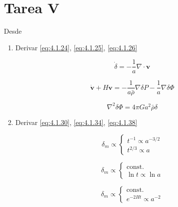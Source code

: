 \documentclass[a4paper]{article}
\begin{document}
\section{Tarea V}
Desde \cite{BaumannTripos}
\begin{enumerate}
	\item Derivar \eqref{eq:4.1.24}, \eqref{eq:4.1.25}, \eqref{eq:4.1.26}
	
\begin{equation}
\dot{\delta} = -\frac{1}{a} \nabla \cdot \mathbf{v}
\tag{4.1.24}
\label{eq:4.1.24}
\end{equation}

\begin{equation}
\dot{\mathbf{v}} + H\mathbf{v} = - \frac{1}{a\bar{\rho}} \nabla \delta P - \frac{1}{a} \nabla \delta \Phi
\tag{4.1.25}
\label{eq:4.1.25}
\end{equation}

\begin{equation}
\nabla^2 \delta \Phi = 4\pi G a^2 \bar{\rho} \delta
\tag{4.1.26}
\label{eq:4.1.26}
\end{equation}


	
	\item Derivar \eqref{eq:4.1.30}, \eqref{eq:4.1.34}, \eqref{eq:4.1.38}
	
\begin{equation}
\delta_m \propto \begin{cases} t^{-1} \propto a^{-3/2} \\ t^{2/3} \propto a \end{cases}
\tag{4.1.30}
\label{eq:4.1.30}
\end{equation}

\begin{equation}
\delta_m \propto \begin{cases} \text{const.} \\ \ln t \propto \ln a \end{cases}
\tag{4.1.34}
\label{eq:4.1.34}
\end{equation}

\begin{equation}
\delta_m \propto \begin{cases} \text{const.} \\ e^{-2Ht} \propto a^{-2} \end{cases}
\tag{4.1.38}
\label{eq:4.1.38}
\end{equation}


\end{enumerate}
\end{document}
